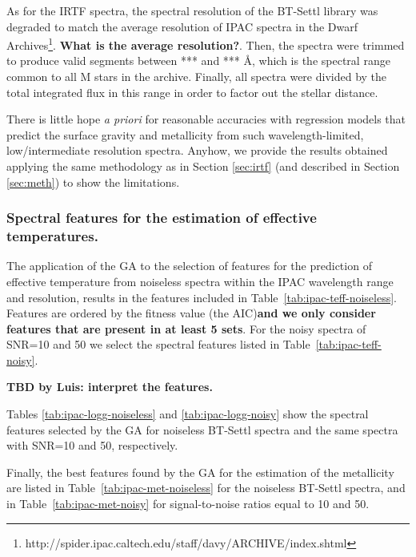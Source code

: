 
As for the IRTF spectra, the spectral resolution of the BT-Settl
library was degraded to match the average resolution of IPAC spectra
in the Dwarf
Archives\footnote{http://spider.ipac.caltech.edu/staff/davy/ARCHIVE/index.shtml}. {\bf
What is the average resolution?}. Then, the spectra were trimmed to
produce valid segments between *** and *** {\AA}, which is the
spectral range common to all M stars in the archive. Finally, all
spectra were divided by the total integrated flux in this range in
order to factor out the stellar distance.

There is little hope {\it a priori} for reasonable accuracies with
regression models that predict the surface gravity and metallicity
from such wavelength-limited, low/intermediate resolution
spectra. Anyhow, we provide the results obtained applying the same
methodology as in Section \ref{sec:irtf} (and described in
Section \ref{sec:meth}) to show the limitations.

\subsubsection{Spectral features for the estimation of effective temperatures.}

The application of the GA to the selection of features for the
prediction of effective temperature from noiseless spectra within the
IPAC wavelength range and resolution, results in the features included
in Table~\ref{tab:ipac-teff-noiseless}. Features are ordered by the
fitness value (the AIC){\bf and we only consider features that are
present in at least 5 sets}. For the noisy spectra of SNR=10 and 50 we
select the spectral features listed in
Table~\ref{tab:ipac-teff-noisy}.

{\bf TBD by Luis: interpret the features.}

Tables \ref{tab:ipac-logg-noiseless} and \ref{tab:ipac-logg-noisy}
show the spectral features selected by the GA for noiseless BT-Settl
spectra and the same spectra with SNR=10 and 50, respectively.

Finally, the best features found by the GA for the estimation of the
metallicity are listed in Table~\ref{tab:ipac-met-noiseless} for the
noiseless BT-Settl spectra, and in Table~\ref{tab:ipac-met-noisy} for
signal-to-noise ratios equal to 10 and 50.

